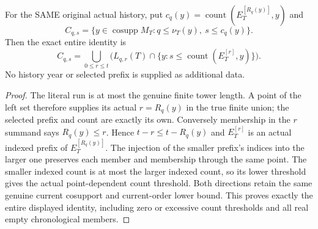 \begin{lemma}
\label{hir:original-companion-chronological-count-finite-union-dictionary}
\leanok
{}
For the SAME original actual history, put
$c_q(y)=\operatorname{count}(E^{[R_q(y)]}_T,y)$ and
\[
 C_{q,s}=\{y\in\operatorname{cosupp}M_T:q\le\nu_T(y),\ s\le c_q(y)\}.
\]
Then the exact entire identity is
\[
 C_{q,s}=\bigcup_{0\le r\le t}
 \bigl(L_{q,r}(T)\cap\{y:s\le\operatorname{count}(E^{[r]}_T,y)\}\bigr).
\]
No history year or selected prefix is supplied as additional data.
\end{lemma}
\begin{proof}
The literal run is at most the genuine finite tower length. A point of the
left set therefore supplies its actual $r=R_q(y)$ in the true finite union;
the selected prefix and count are exactly its own. Conversely membership
in the $r$ summand says $R_q(y)\le r$. Hence $t-r\le t-R_q(y)$ and
$E^{[r]}_T$ is an actual indexed prefix of $E^{[R_q(y)]}_T$.
The injection of the smaller prefix's indices into the larger one preserves
each member and membership through the same point. The smaller indexed
count is at most the larger indexed count, so its lower threshold gives
the actual point-dependent count threshold. Both directions retain the
same genuine current cosupport and current-order lower bound. This proves
exactly the entire displayed identity, including zero or excessive count
thresholds and all real empty chronological members.
\end{proof}

